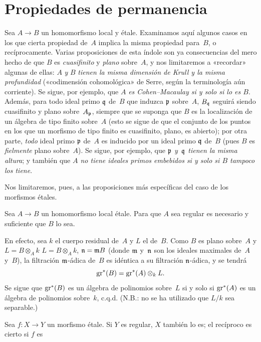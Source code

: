 \section{Propiedades de permanencia}
\label{I.9}
Sea $A\to B$ un homomorfismo local y étale. Examinamos aquí algunos casos en los que cierta propiedad de~$A$ implica la misma propiedad para~$B$, o recíprocamente.
Varias proposiciones de esta índole son ya consecuencias del mero hecho de que $B$ es \emph{cuasifinito} y \emph{plano} sobre~$A$, y nos limitaremos a «recordar» algunas de ellas: $A$ \emph{y} $B$ \emph{tienen la misma dimensión de Krull y la misma profundidad} («codimensión cohomológica» de Serre, según la terminología aún corriente). Se sigue, por ejemplo, que $A$ \emph{es Cohen--Macaulay si y solo si lo es $B$}. Además, para todo ideal primo $\mathfrak{q}$ de~$B$ que induzca $\mathfrak{p}$ sobre~$A$, $B_{\mathfrak{q}}$ seguirá siendo cuasifinito y plano sobre~$A_{\mathfrak{p}}$, siempre que se suponga que $B$ es la localización de un álgebra de tipo finito sobre~$A$ (esto se sigue de que el conjunto de los puntos en los que un morfismo de tipo finito es cuasifinito, \resp plano, es abierto); por otra parte, \emph{todo} ideal primo $\mathfrak{p}$ de~$A$ es inducido por un ideal primo $\mathfrak{q}$ de~$B$ (pues $B$ es \emph{fielmente} plano sobre~$A$). Se sigue, por ejemplo, que \emph{$\mathfrak{p}$ y~$\mathfrak{q}$ tienen la misma altura}; y también que \emph{$A$ no tiene ideales primos embebidos si y solo si $B$ tampoco los tiene}.

Nos limitaremos, pues, a las proposiciones más específicas del caso de los morfismos étales.

\begin{proposition}
\label{I.9.1}
Sea $A\to B$ un homomorfismo local étale. Para que $A$ sea regular es necesario y suficiente que $B$ lo sea.
\end{proposition}
En efecto, sea $k$ el cuerpo residual de~$A$ y $L$ el de~$B$. Como $B$ es plano sobre~$A$ y
{$L=B\otimes_Ak$}
{$L=B\otimes_Ak$,}
\ie $\mathfrak{n}=\mathfrak{m}B$ (donde $\mathfrak{m}$ y~$\mathfrak{n}$ son los ideales maximales de~$A$ y~$B$), la filtración $\mathfrak{m}$-ádica de~$B$ es idéntica a su filtración $\mathfrak{n}$-ádica, y se tendrá
$$
\operatorname{gr}^*(B)=\operatorname{gr}^*(A)\otimes_kL.
$$
Se sigue que $\operatorname{gr}^*(B)$ es un álgebra de polinomios sobre~$L$ si y solo si $\operatorname{gr}^*(A)$ es un álgebra de polinomios sobre~$k$, c.q.d. (N.B.: no se ha utilizado que $L/k$ sea separable.)

\begin{corollaire}
\label{I.9.2}
Sea $f\colon X\to Y$ un morfismo étale. Si $Y$ es regular, $X$ también lo es; el recíproco es cierto si $f$ es %
\end{corollaire}

